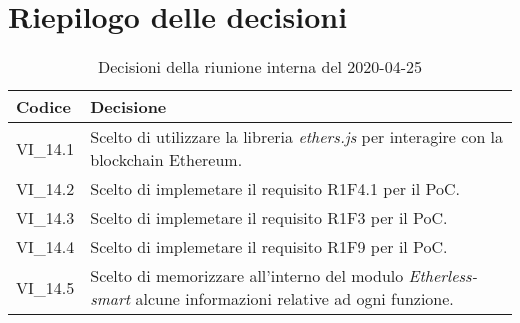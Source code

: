 \section{Riepilogo delle decisioni}
\begin{longtable}{ 
	 >{\centering}p{} >{}p{} }
	
	\caption{Decisioni della riunione interna del 2020-04-25}\\	
	
	\textbf{\color{white}Codice} & 
	\textbf{\color{white}Decisione} 
	\tabularnewline  
	\endhead
	
	VI\_14.1 & Scelto di utilizzare la libreria \textit{ethers.js} per interagire con la blockchain Ethereum. \\
	VI\_14.2 & Scelto di implemetare il requisito R1F4.1 per il PoC. \\
	VI\_14.3 & Scelto di implemetare il requisito R1F3 per il PoC. \\
	VI\_14.4 & Scelto di implemetare il requisito R1F9 per il PoC. \\	
	VI\_14.5 & Scelto di memorizzare all'interno del modulo \textit{Etherless-smart} alcune informazioni relative ad ogni funzione. \\
	

\end{longtable}